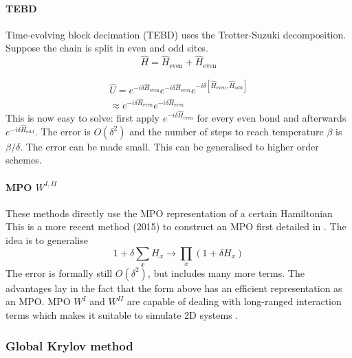 \paragraph{TEBD}
Time-evolving block decimation (TEBD)  uses the Trotter-Suzuki decomposition. Suppose the chain is split in even and odd sites.
\begin{equation}
    \hat{H} = \hat{H}_{\text{even}}+\hat{H}_{\text{even}}
\end{equation}

\begin{equation}\label{trotter_exp}
    \begin{split}
        \hat{U} = e^{-i \delta \hat{H}_{\text{even}}}  e^{-i \delta \hat{H}_{\text{even}} }e^{-i \delta \left[ \hat{H}_{\text{even}}, \hat{H}_{\text{odd}} \right] }\\
        \approx e^{-i \delta \hat{H}_{\text{even}}}  e^{-i \delta \hat{H}_{\text{even}} }
    \end{split}
\end{equation}
This is now easy to solve: first apply $e^{-i \delta \hat{H}_{\text{even}}}$ for every even bond and afterwards  $e^{-i \delta \hat{H}_{\text{odd}}}$. The error is $O(\delta^2)$ and the number of steps to reach temperature $\beta$ is $\beta / \delta$. The error can be made small. This can be generalised to higher order schemes.

\paragraph{ MPO $W^{I,II}$}
These methods directly use the MPO representation of a certain Hamiltonian
This is a more recent method (2015) to construct an MPO first detailed in \cite{Zaletel2015}. The idea is to generalise
\begin{equation}
    1+ \delta \sum_x H_x \rightarrow \prod_x (1+  \delta H_x)
\end{equation}
The error is formally still $O(\delta^2)$, but includes many more terms. The advantages lay in the fact that the form above has an efficient representation as an MPO. MPO $W^I$ and $W^{II}$ are capable of dealing with long-ranged interaction terms which makes it suitable to simulate 2D systems \cite{Paeckel2019}.

\subsubsection{Global Krylov method}

